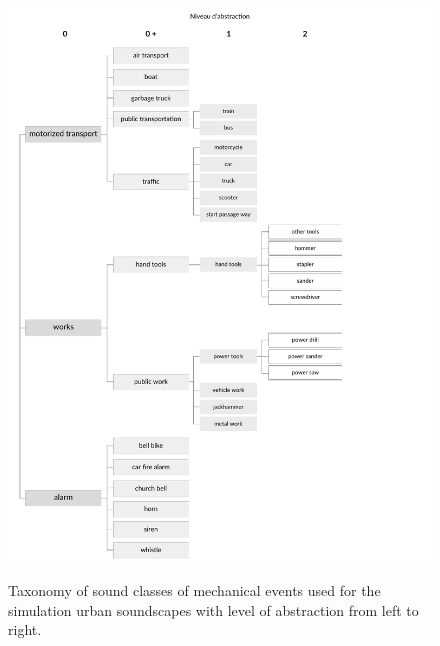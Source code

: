 \documentclass[12pt]{elsarticle}
\begin{document}
\begin{figure}[!hp]
    \centering
        {\includegraphics[trim={ 0 0 0cm 1cm},clip,width=.9\columnwidth]{gfx/appendix/event_1_en}\label{fig:taxonomieEventa}} \par
         \caption{Taxonomy of sound classes of mechanical events used for the simulation urban soundscapes with level of abstraction from left to right.}
       \label{fig:taxonomieEa}
\end{figure}
\end{document}
